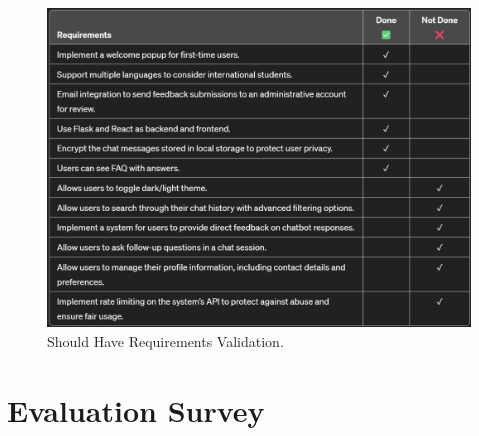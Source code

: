 \documentclass{l4proj}
\begin{document}
\begin{appendices}
\begin{figure}[h!]
  \centering
  \begin{adjustbox}{center,max height=0.53\textheight, max width=\linewidth}
    \includegraphics{images/shouldhave.png}
  \end{adjustbox}
  \caption{Should Have Requirements Validation.}
\end{figure}


\chapter{Evaluation Survey}
\label{Evaluation Survey}



\end{appendices}
\end{document}
